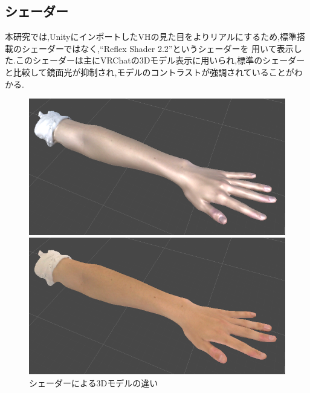 \documentclass{ltjsreport}
\begin{document}
		\subsection{シェーダー}
			本研究では,UnityにインポートしたVHの見た目をよりリアルにするため,標準搭載のシェーダーではなく,``Reflex Shader 2.2''というシェーダーを
			用いて表示した.このシェーダーは主にVRChatの3Dモデル表示に用いられ,標準のシェーダーと比較して鏡面光が抑制され,モデルのコントラストが強調されていることがわかる.
			\begin{figure}[H]
			\centering
			\begin{minipage}{0.4\columnwidth}
			\centering
			\includegraphics[width = \columnwidth]{../figs/NomalShader.png}
			\end{minipage}
			\hspace{0.04\columnwidth}
			\begin{minipage}{0.4\columnwidth}
			\centering
			\includegraphics[width = \columnwidth]{../figs/ReflexShader.png}
			\end{minipage}
			\caption{シェーダーによる3Dモデルの違い}
			\label{fig:Shader}
			\end{figure}
\end{document}
